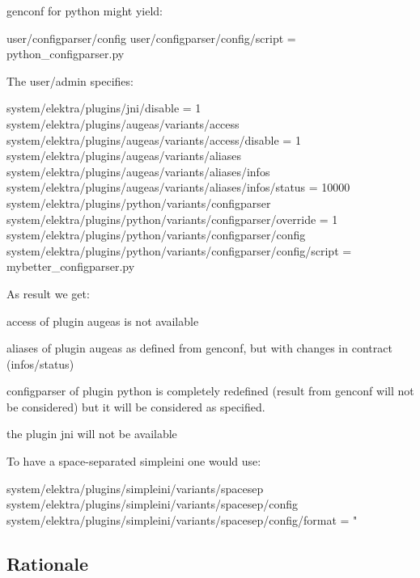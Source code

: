 {\ttfamily genconf} for python might yield\+:


\begin{DoxyCode}
user/configparser/config
user/configparser/config/script = python\_configparser.py
\end{DoxyCode}


The user/admin specifies\+:


\begin{DoxyCode}
system/elektra/plugins/jni/disable = 1
system/elektra/plugins/augeas/variants/access
system/elektra/plugins/augeas/variants/access/disable = 1
system/elektra/plugins/augeas/variants/aliases
system/elektra/plugins/augeas/variants/aliases/infos
system/elektra/plugins/augeas/variants/aliases/infos/status = 10000
system/elektra/plugins/python/variants/configparser
system/elektra/plugins/python/variants/configparser/override = 1
system/elektra/plugins/python/variants/configparser/config
system/elektra/plugins/python/variants/configparser/config/script = mybetter\_configparser.py
\end{DoxyCode}


As result we get\+:


\begin{DoxyEnumerate}
\item {\ttfamily access} of plugin {\ttfamily augeas} is not available
\item {\ttfamily aliases} of plugin {\ttfamily augeas} as defined from {\ttfamily genconf}, but with changes in contract ({\ttfamily infos/status})
\item {\ttfamily configparser} of plugin {\ttfamily python} is completely redefined (result from {\ttfamily genconf} will not be considered) but it will be considered as specified.
\item the plugin {\ttfamily jni} will not be available
\end{DoxyEnumerate}

To have a space-\/separated simpleini one would use\+:


\begin{DoxyCode}
system/elektra/plugins/simpleini/variants/spacesep
system/elektra/plugins/simpleini/variants/spacesep/config
system/elektra/plugins/simpleini/variants/spacesep/config/format = "%
\end{DoxyCode}


\subsection*{Rationale}


